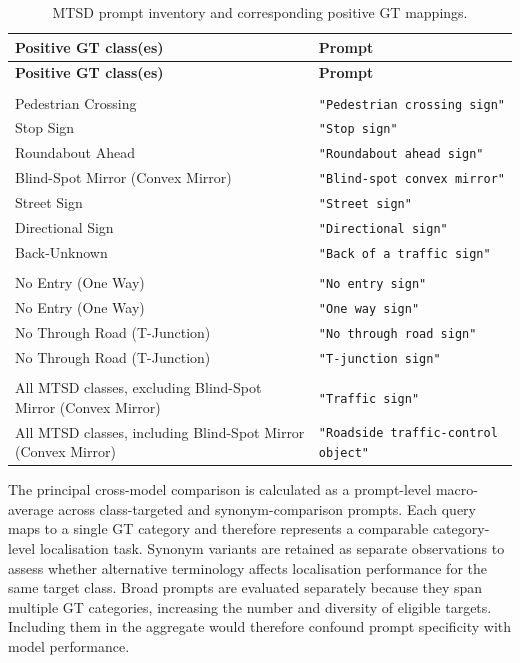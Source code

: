 \begin{longtable}{
    @{}
    >{\raggedright\arraybackslash}p{}
    >{\raggedleft\arraybackslash}p{}
    @{}
}
\caption{\gls{MTSD} prompt inventory and corresponding positive \gls{GT} mappings.}
\label{tab:primary-mtsd-prompts}\\
\toprule
\textbf{Positive \gls{GT} class(es)} & \textbf{Prompt} \\
\midrule
\endfirsthead
\toprule
\textbf{Positive \gls{GT} class(es)} & \textbf{Prompt} \\
\midrule
\endhead

\multicolumn{2}{@{}l}{\textbf{\textsc{Class-targeted prompts}}} \\
\cmidrule(lr){1-2}
Pedestrian Crossing & \texttt{"Pedestrian crossing sign"} \\
Stop Sign & \texttt{"Stop sign"} \\
Roundabout Ahead & \texttt{"Roundabout ahead sign"} \\
Blind-Spot Mirror (Convex Mirror) & \texttt{"Blind-spot convex mirror"} \\
Street Sign & \texttt{"Street sign"} \\
Directional Sign & \texttt{"Directional sign"} \\
Back-Unknown & \texttt{"Back of a traffic sign"} \\
\addlinespace[0.7em]

\multicolumn{2}{@{}l}{\textbf{\textsc{Synonym-comparison prompts}}} \\
\cmidrule(lr){1-2}
No Entry (One Way) & \texttt{"No entry sign"} \\
No Entry (One Way) & \texttt{"One way sign"} \\
No Through Road (T-Junction) & \texttt{"No through road sign"} \\
No Through Road (T-Junction) & \texttt{"T-junction sign"} \\
\addlinespace[0.7em]

\multicolumn{2}{@{}l}{\textbf{\textsc{Broad prompts}}} \\
\cmidrule(lr){1-2}
All \gls{MTSD} classes, excluding Blind-Spot Mirror (Convex Mirror)
& \texttt{"Traffic sign"} \\
All \gls{MTSD} classes, including Blind-Spot Mirror (Convex Mirror)
& \texttt{"Roadside traffic-control object"} \\
\bottomrule
\end{longtable}

\noindent The principal cross-model comparison is calculated as a prompt-level macro-average across class-targeted and synonym-comparison prompts. Each query maps to a single \gls{GT} category and therefore represents a comparable category-level localisation task. Synonym variants are retained as separate observations to assess whether alternative terminology affects localisation performance for the same target class. Broad prompts are evaluated separately because they span multiple \gls{GT} categories, increasing the number and diversity of eligible targets. Including them in the aggregate would therefore confound prompt specificity with model performance.

